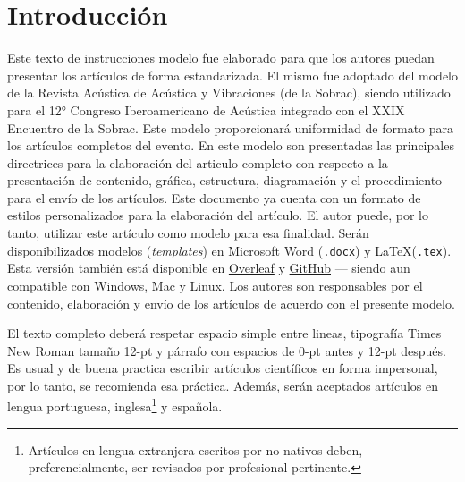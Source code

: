 \documentclass[12pt, a4paper, twoside, twocolumn]{article}
\begin{document}
 \setcounter{page}{1} 
\clearpage %

\section{Introducción}
Este texto de instrucciones modelo fue elaborado para que los autores puedan presentar los artículos de forma estandarizada. El mismo fue adoptado del modelo de la Revista Acústica de Acústica y Vibraciones (de la Sobrac), siendo utilizado para el 12° Congreso Iberoamericano de Acústica integrado con el XXIX Encuentro de la Sobrac.
%
Este modelo proporcionará uniformidad de formato para los artículos completos del evento.
En este modelo son presentadas las principales directrices para la elaboración del articulo completo con respecto a la presentación de contenido, gráfica, estructura, diagramación y el procedimiento para el envío de los artículos.
Este documento ya cuenta con un formato de estilos personalizados para la elaboración del artículo. El autor puede, por lo tanto, utilizar este artículo como modelo para esa finalidad. Serán disponibilizados modelos (\textit{templates}) en Microsoft Word (\texttt{.docx}) y \LaTeX\xspace (\texttt{.tex}). Esta versión también está disponible en \href{https://www.overleaf.com/read/rnfjxkknksnd}{Overleaf} y \href{https://github.com/willdfonseca/fia2020}{GitHub} --- siendo aun compatible con Windows, Mac y Linux.
Los autores son responsables por el contenido, elaboración y envío de los artículos de acuerdo con el presente modelo.


El texto completo deberá respetar espacio simple entre lineas, tipografía Times New Roman tamaño 12-pt y párrafo con espacios de 0-pt antes y 12-pt después. Es usual y de buena practica escribir artículos científicos en forma impersonal, por lo tanto, se recomienda esa práctica. Además, serán aceptados artículos en lengua portuguesa, inglesa\footnote{ Artículos en lengua extranjera escritos por no nativos deben, preferencialmente, ser revisados por profesional pertinente.} y española.
\end{document}
